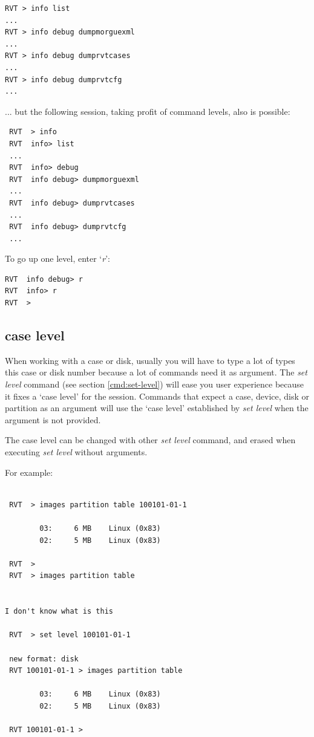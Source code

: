\documentclass[a4paper,11pt,oneside]{report}
\begin{document}
\begin{verbatim}
RVT > info list
...
RVT > info debug dumpmorguexml
...
RVT > info debug dumprvtcases
...
RVT > info debug dumprvtcfg
...
\end{verbatim}


... but the following session, taking profit of command levels, also is possible:

\begin{verbatim}
 RVT  > info 
 RVT  info> list
 ...  
 RVT  info> debug
 RVT  info debug> dumpmorguexml
 ...
 RVT  info debug> dumprvtcases
 ...
 RVT  info debug> dumprvtcfg
 ...
\end{verbatim}


To go up one level, enter `\emph{r}':

\begin{verbatim}
RVT  info debug> r
RVT  info> r
RVT  > 
\end{verbatim}


\subsection{case level}

When working with a case or disk, usually you will have to type a lot of types this case or disk number because a lot of commands need it as argument. The \emph{set level} command (see section \ref{cmd:set-level}) will ease you user experience because it fixes a `case level' for the session. Commands that expect a case, device, disk or partition as an argument will use the `case level' established by \emph{set level} when the argument is not provided. 

The case level can be changed with other \emph{set level} command, and erased when executing \emph{set level} without arguments.

For example:

\begin{verbatim}

 RVT  > images partition table 100101-01-1                                    

        03:     6 MB    Linux (0x83)
        02:     5 MB    Linux (0x83)

 RVT  > 
 RVT  > images partition table


I don't know what is this

 RVT  > set level 100101-01-1                                                 

 new format: disk
 RVT 100101-01-1 > images partition table                                     

        03:     6 MB    Linux (0x83)
        02:     5 MB    Linux (0x83)

 RVT 100101-01-1 > 
\end{verbatim}
\end{document}
